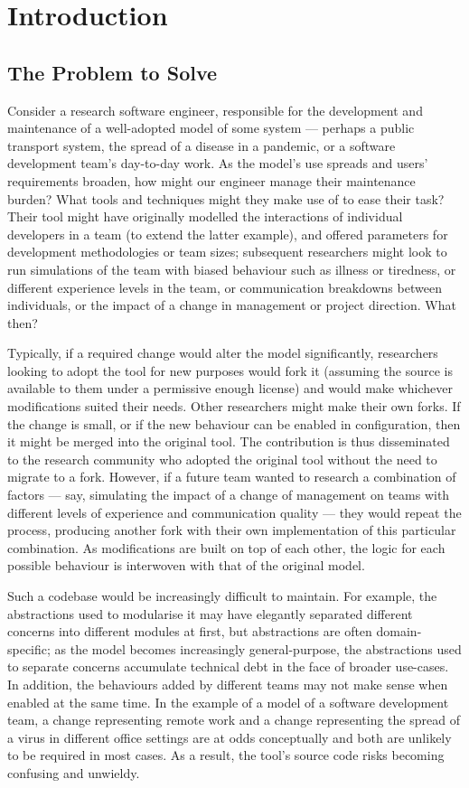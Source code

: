 \chapter{Introduction}

\section{The Problem to Solve}

Consider a research software engineer, responsible for the development and
maintenance of a well-adopted model of some \sociotechnical system --- perhaps a
public transport system, the spread of a disease in a pandemic, or a software
development team's day-to-day work. As the model's use spreads and users'
requirements broaden, how might our engineer manage their maintenance burden?
What tools and techniques might they make use of to ease their task? Their tool
might have originally modelled the interactions of individual developers in a
team (to extend the latter example), and offered parameters for development
methodologies or team sizes; subsequent researchers might look to run
simulations of the team with biased behaviour such as illness or tiredness, or
different experience levels in the team, or communication breakdowns between
individuals, or the impact of a change in management or project direction. What
then?

Typically, if a required change would alter the model significantly, researchers
looking to adopt the tool for new purposes would fork it (assuming the source is
available to them under a permissive enough license) and would make whichever
modifications suited their needs. Other researchers might make their own forks.
If the change is small, or if the new behaviour can be enabled in configuration,
then it might be merged into the original tool. The contribution is thus
disseminated to the research community who adopted the original tool without the
need to migrate to a fork. However, if a future team wanted to research a
combination of factors --- say, simulating the impact of a change of management
on teams with different levels of experience and communication quality --- they
would repeat the process, producing another fork with their own implementation
of this particular combination. As modifications are built on top of each other,
the logic for each possible behaviour is interwoven with that of the original
model.

Such a codebase would be increasingly difficult to maintain. For example, the
abstractions used to modularise it may have elegantly separated different
concerns into different modules at first, but abstractions are often
domain-specific; as the model becomes increasingly general-purpose, the
abstractions used to separate concerns accumulate technical debt in the face of
broader use-cases. In addition, the behaviours added by different teams may not
make sense when enabled at the same time. In the example of a model of a
software development team, a change representing remote work and a change
representing the spread of a virus in different office settings are at odds
conceptually and both are unlikely to be required in most cases. As a result,
the tool's source code risks becoming confusing and unwieldy.

